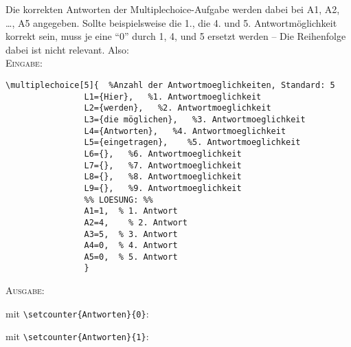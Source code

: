 \documentclass[a4paper,12pt]{article}
\begin{document}
Die korrekten Antworten der Multiplechoice-Aufgabe werden dabei bei A1, A2, \ldots, A5 angegeben. Sollte beispielsweise die 1., die 4. und 5. Antwortmöglichkeit korrekt sein, muss je eine "`0"' durch 1, 4, und 5 ersetzt werden -- Die Reihenfolge dabei ist nicht relevant. Also: \\

\textsc{Eingabe:}

\begin{verbatim}
\multiplechoice[5]{  %Anzahl der Antwortmoeglichkeiten, Standard: 5
				L1={Hier},   %1. Antwortmoeglichkeit 
				L2={werden},   %2. Antwortmoeglichkeit
				L3={die möglichen},   %3. Antwortmoeglichkeit
				L4={Antworten},   %4. Antwortmoeglichkeit
				L5={eingetragen},	 %5. Antwortmoeglichkeit
				L6={},	 %6. Antwortmoeglichkeit
				L7={},	 %7. Antwortmoeglichkeit
				L8={},	 %8. Antwortmoeglichkeit
				L9={},	 %9. Antwortmoeglichkeit
				%% LOESUNG: %%
				A1=1,  % 1. Antwort
				A2=4,	 % 2. Antwort
				A3=5,  % 3. Antwort
				A4=0,  % 4. Antwort
				A5=0,  % 5. Antwort
				}
\end{verbatim}

\textsc{Ausgabe:}\vspace{0.2cm}

\begin{minipage}{8cm}
\setcounter{Antworten}{0}
mit \texttt{\textbackslash setcounter\{Antworten\}\{0\}}:
\begin{center}
\end{center}
\end{minipage} \hfill 
\begin{minipage}{8cm}
mit \texttt{\textbackslash setcounter\{Antworten\}\{1\}}:
\setcounter{Antworten}{1}
\begin{center}
\end{center}
\end{minipage}
\end{document}
